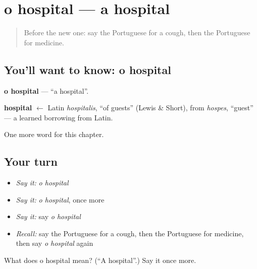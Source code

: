 \section[o hospital]{o hospital — a hospital}

\label{lesson:PT-C34-hospital}



\begin{quote}
Before the new one: say the Portuguese for a cough, then the Portuguese for medicine.
\end{quote}

\subsection*{You'll want to know: o hospital}
\textbf{o hospital} — \textquotedblleft{}a hospital\textquotedblright{}.

\begin{cousinweb}
\textbf{hospital} $\leftarrow$ Latin \emph{hospitalis}, \textquotedblleft{}of guests\textquotedblright{} (Lewis \& Short), from \emph{hospes}, \textquotedblleft{}guest\textquotedblright{} — a learned borrowing from Latin.
\end{cousinweb}

\begin{grammarlens}[title={What you've built}]
One more word for this chapter.
\end{grammarlens}

\subsection*{Your turn}
\begin{itemize}
\raggedright
  \item \emph{Say it:} \emph{o hospital}
  \item \emph{Say it:} \emph{o hospital}, once more
  \item \emph{Say it:} say \emph{o hospital}
  \item \emph{Recall:} say the Portuguese for a cough, then the Portuguese for medicine, then say \emph{o hospital} again
\end{itemize}

\begin{tcolorbox}[breakable,colback=teal!4,colframe=teal!35!black,title={Before you move on}]
What does o hospital mean? (\textquotedblleft{}A hospital\textquotedblright{}.) Say it once more.
\end{tcolorbox}
